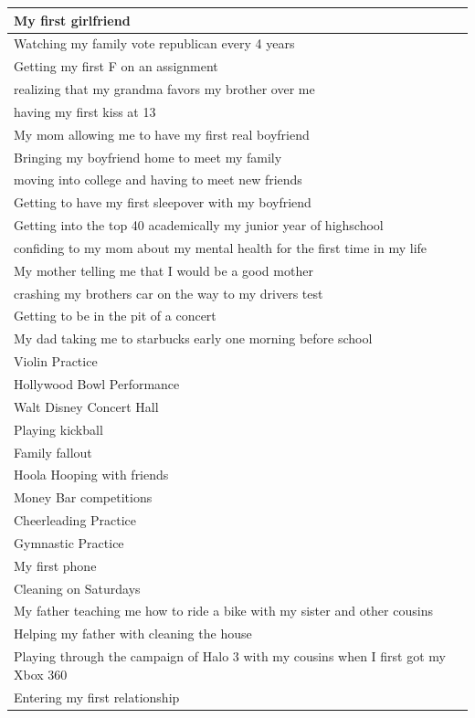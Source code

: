 \documentclass[
  .7em,
  letterpaper,
  DIV=11,
  numbers=noendperiod]{scrartcl}
\begin{document}
\begin{table}
\begin{tabular}{l}
\hline
My first girlfriend\\
\hline
Watching my family vote republican every 4 years\\
\hline
Getting my first F on an assignment\\
\hline
realizing that my grandma favors my brother over me\\
\hline
having my first kiss at 13\\
\hline
My mom allowing me to have my first real boyfriend\\
\hline
Bringing my boyfriend home to meet my family\\
\hline
moving into college and having to meet new friends\\
\hline
Getting to have my first sleepover with my boyfriend\\
\hline
Getting into the top 40 academically my junior year of highschool\\
\hline
confiding to my mom about my mental health for the first time in my life\\
\hline
My mother telling me that I would be a good mother\\
\hline
crashing my brothers car on the way to my drivers test\\
\hline
Getting to be in the pit of a concert\\
\hline
My dad taking me to starbucks early one morning before school\\
\hline
Violin Practice\\
\hline
Hollywood Bowl Performance\\
\hline
Walt Disney Concert Hall\\
\hline
Playing kickball\\
\hline
Family fallout\\
\hline
Hoola Hooping with friends\\
\hline
Money Bar competitions\\
\hline
Cheerleading Practice\\
\hline
Gymnastic Practice\\
\hline
My first phone\\
\hline
Cleaning on Saturdays\\
\hline
My father teaching me how to ride a bike with my sister and other cousins\\
\hline
Helping my father with cleaning the house\\
\hline
Playing through the campaign of Halo 3 with my cousins when I first got my Xbox 360\\
\hline
Entering my first relationship\\

\end{tabular}
\end{table}
\end{document}

